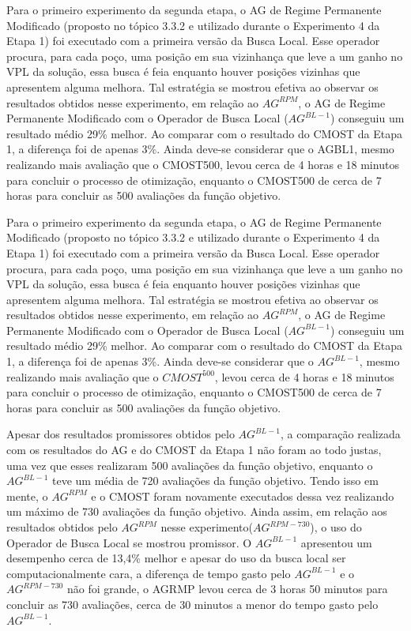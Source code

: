Para o primeiro experimento da segunda etapa, o AG de Regime Permanente Modificado (proposto no tópico 3.3.2 e utilizado durante o Experimento 4 da Etapa 1) foi executado com a primeira versão da Busca Local. Esse operador procura, para cada poço, uma posição em sua vizinhança que leve a um ganho no VPL da solução, essa busca é feia enquanto houver posições vizinhas que apresentem alguma melhora. Tal estratégia se mostrou efetiva ao observar os resultados obtidos nesse experimento, em relação ao $AG^{RPM}$, o AG de Regime Permanente Modificado com o Operador de Busca Local ($AG^{BL-1}$) conseguiu um resultado médio 29\% melhor. Ao comparar com o resultado do CMOST da Etapa 1, a diferença foi de apenas 3\%. Ainda deve-se considerar que o AGBL1, mesmo realizando mais avaliação que o CMOST500, levou cerca de 4 horas e 18 minutos para concluir o processo de otimização, enquanto o CMOST500 de cerca de 7 horas para concluir as 500 avaliações da função objetivo.

Para o primeiro experimento da segunda etapa, o AG de Regime Permanente Modificado (proposto no tópico 3.3.2 e utilizado durante o Experimento 4 da Etapa 1) foi executado com a primeira versão da Busca Local. Esse operador procura, para cada poço, uma posição em sua vizinhança que leve a um ganho no VPL da solução, essa busca é feia enquanto houver posições vizinhas que apresentem alguma melhora. Tal estratégia se mostrou efetiva ao observar os resultados obtidos nesse experimento, em relação ao $AG^{RPM}$, o AG de Regime Permanente Modificado com o Operador de Busca Local ($AG^{BL-1}$) conseguiu um resultado médio 29\% melhor. Ao comparar com o resultado do CMOST da Etapa 1, a diferença foi de apenas 3\%. Ainda deve-se considerar que o $AG^{BL-1}$, mesmo realizando mais avaliação que o $CMOST^{500}$, levou cerca de 4 horas e 18 minutos para concluir o processo de otimização, enquanto o CMOST500 de cerca de 7 horas para concluir as 500 avaliações da função objetivo.

Apesar dos resultados promissores obtidos pelo $AG^{BL-1}$, a comparação realizada com os resultados do AG e do CMOST da Etapa 1 não foram ao todo justas, uma vez que esses realizaram 500 avaliações da função objetivo, enquanto o $AG^{BL-1}$ teve um média de 720 avaliações da função objetivo. Tendo isso em mente, o $AG^{RPM}$ e o CMOST foram novamente executados dessa vez realizando um máximo de 730 avaliações da função objetivo. Ainda assim, em relação aos resultados obtidos pelo $AG^{RPM}$ nesse experimento($AG^{RPM-730}$), o uso do Operador de Busca Local se mostrou promissor. O $AG^{BL-1}$ apresentou um desempenho cerca de 13,4\% melhor e apesar do uso da busca local ser computacionalmente cara, a diferença de tempo gasto pelo $AG^{BL-1}$ e o $AG^{RPM-730}$ não foi grande, o AGRMP levou cerca de 3 horas 50 minutos para concluir as 730 avaliações, cerca de 30 minutos a menor do tempo gasto pelo $AG^{BL-1}$.

